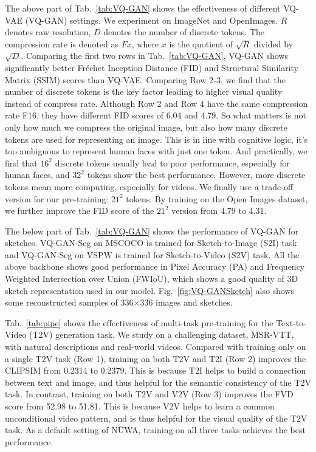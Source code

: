 The above part of Tab.~\ref{tab:VQ-GAN} shows the effectiveness of different VQ-VAE (VQ-GAN) settings. We experiment on ImageNet\cite{russakovskyImageNetLargeScale2015} and OpenImages\cite{kuznetsovaOpenImagesDataset2020}. $R$ denotes raw resolution, $D$ denotes the number of discrete tokens. The compression rate is denoted as $Fx$, where $x$ is the quotient of $\sqrt{R}$ divided by $\sqrt{D}$. Comparing the first two rows in Tab.~\ref{tab:VQ-GAN}, VQ-GAN shows significantly better Fréchet Inception Distance (FID)\cite{heuselGansTrainedTwo2017} and Structural Similarity Matrix (SSIM) scores than VQ-VAE. Comparing Row 2-3, we find that the number of discrete tokens is the key factor leading to higher visual quality instead of compress rate. Although Row 2 and Row 4 have the same compression rate F16, they have different FID scores of 6.04 and 4.79. So what matters is not only how much we compress the original image, but also how many discrete tokens are used for representing an image. This is in line with cognitive logic, it’s too ambiguous to represent human faces with just one token. And practically, we find that $16^2$ discrete tokens usually lead to poor performance, especially for human faces, and $32^2$ tokens show the best performance. However, more discrete tokens mean more computing, especially for videos. We finally use a trade-off version for our pre-training: $21^2$ tokens. By training on the Open Images dataset, we further improve the FID score of the $21^2$ version from 4.79 to 4.31.

The below part of Tab.~\ref{tab:VQ-GAN} shows the performance of VQ-GAN for sketches. VQ-GAN-Seg on MSCOCO\cite{linMicrosoftCocoCommon2014} is trained for Sketch-to-Image (S2I) task and VQ-GAN-Seg on VSPW\cite{miaoVSPWLargescaleDataset2021} is trained for Sketch-to-Video (S2V) task. All the above backbone shows good performance in Pixel Accuracy (PA) and Frequency Weighted Intersection over Union (FWIoU), which shows a good quality of 3D sketch representation used in our model. Fig.~\ref{fig:VQ-GANSketch} also shows some reconstructed samples of 336×336 images and sketches.

Tab.~\ref{tab:pipe} shows the effectiveness of multi-task pre-training for the Text-to-Video (T2V) generation task. We study on a challenging dataset, MSR-VTT\cite{xuMsrvttLargeVideo2016}, with natural descriptions and real-world videos. Compared with training only on a single T2V task (Row 1), training on both T2V and T2I (Row 2) improves the CLIPSIM from 0.2314 to 0.2379. This is because T2I helps to build a connection between text and image, and thus helpful for the semantic consistency of the T2V task. In contrast, training on both T2V and V2V (Row 3) improves the FVD score from 52.98 to 51.81. This is because V2V helps to learn a common unconditional video pattern, and is thus helpful for the visual quality of the T2V task. As a default setting of NÜWA, training on all three tasks achieves the best performance.

